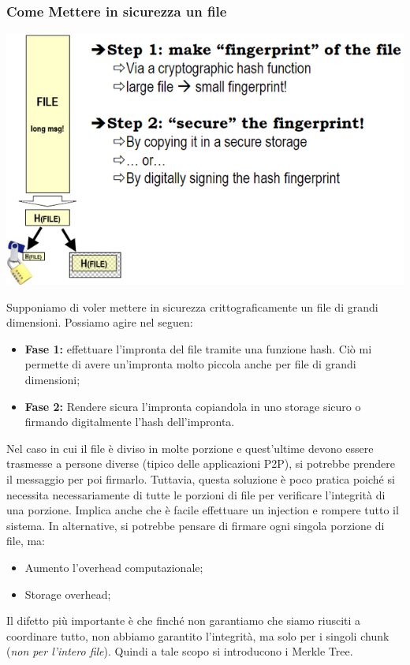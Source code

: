 \documentclass{book}
\theoremstyle{remark}
\begin{document}
\subsubsection{Come Mettere in sicurezza un file}
\begin{center}
	\includegraphics[scale=0.6]{2021-12-09-15-36-54.png}
\end{center}
Supponiamo di voler mettere in sicurezza crittograficamente un file di grandi dimensioni\@. Possiamo agire nel seguen:\begin{itemize}
	\item \textbf{Fase 1:} effettuare l'impronta del file tramite una funzione hash\@. Ciò mi permette di avere un'impronta molto piccola anche per file di grandi dimensioni;\@
	\item \textbf{Fase 2:} Rendere sicura l'impronta copiandola in uno storage sicuro o firmando digitalmente l'hash dell'impronta\@.
\end{itemize}
Nel caso in cui il file è diviso in molte porzione e quest'ultime devono essere trasmesse a persone diverse (tipico delle applicazioni P2P), si potrebbe prendere il messaggio per poi firmarlo\@. Tuttavia, questa soluzione è poco pratica poiché si necessita necessariamente di tutte le porzioni di file per verificare l'integrità di una porzione\@. Implica anche che è facile effettuare un injection e rompere tutto il sistema\@. \newline
In alternative, si potrebbe pensare di firmare ogni singola porzione di file, ma:\begin{itemize}
	\item Aumento l'overhead computazionale;\@
	\item Storage overhead;\@
\end{itemize}
Il difetto più importante è che finché non garantiamo che siamo riusciti a coordinare tutto, non abbiamo garantito l'integrità, ma solo per i singoli chunk (\emph{non per l'intero file})\@. Quindi a tale scopo si introducono i Merkle Tree\@.
\end{document}
